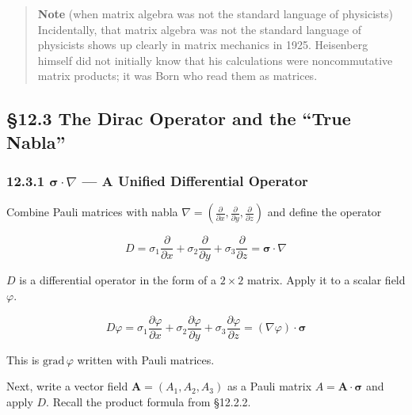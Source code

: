 \documentclass[a4paper,12pt,openany]{book}
\begin{document}
\begin{quote}
\textbf{Note} (when matrix algebra was not the standard language of
physicists) Incidentally, that matrix algebra was not the standard
language of physicists shows up clearly in matrix mechanics in 1925.
Heisenberg himself did not initially know that his calculations were
noncommutative matrix products; it was Born who read them as matrices.
\end{quote}

\par\vspace{0.35em}\par

\hypertarget{the-dirac-operator-and-the-true-nabla}{%
\subsection{§12.3 The Dirac Operator and the ``True
Nabla''}\label{the-dirac-operator-and-the-true-nabla}}

\hypertarget{bmsigmacdotnabla-a-unified-differential-operator}{%
\subsubsection{\texorpdfstring{12.3.1 \(\bm{\sigma}\!\cdot\!\nabla\) —
A Unified Differential
Operator}{12.3.1 \textbackslash bm\{\textbackslash sigma\}\textbackslash!\textbackslash cdot\textbackslash!\textbackslash nabla — A Unified Differential Operator}}\label{bmsigmacdotnabla-a-unified-differential-operator}}

Combine Pauli matrices with nabla
\(\nabla = (\frac{\partial}{\partial x}, \frac{\partial}{\partial y}, \frac{\partial}{\partial z})\)
and define the operator

\[D = \sigma_1\frac{\partial}{\partial x} + \sigma_2\frac{\partial}{\partial y} + \sigma_3\frac{\partial}{\partial z} = \bm{\sigma}\!\cdot\!\nabla\]

\(D\) is a differential operator in the form of a \(2\times2\) matrix.
Apply it to a scalar field \(\varphi\).

\[D\varphi = \sigma_1\frac{\partial\varphi}{\partial x} + \sigma_2\frac{\partial\varphi}{\partial y} + \sigma_3\frac{\partial\varphi}{\partial z} = (\nabla\varphi)\!\cdot\!\bm{\sigma}\]

This is \(\mathrm{grad}\,\varphi\) written with Pauli matrices.

Next, write a vector field \(\mathbf{A} = (A_1, A_2, A_3)\) as a Pauli
matrix \(A = \mathbf{A}\!\cdot\!\bm{\sigma}\) and apply \(D\). Recall
the product formula from §12.2.2.
\end{document}
